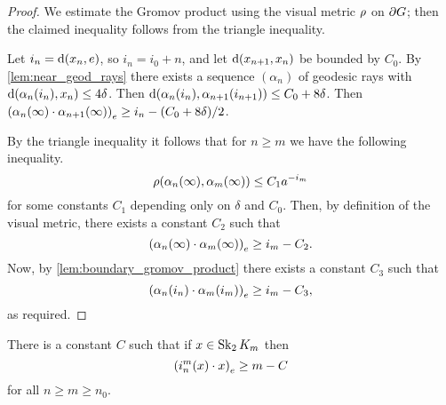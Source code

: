 \documentclass[a4paper]{article}
\begin{document}
\begin{proof}
  We estimate the Gromov product using the visual metric $\vdistance$ on 
  $\boundary G$; then the claimed inequality follows from the triangle 
  inequality. 
  
  Let $i_n = \dist(x_n, e)$, so $i_n = i_0 + n$, and let 
  $\dist(x_{n+1},x_n)$ be bounded by $C_0$. By 
  \cref{lem:near_geod_rays} there exists a sequence $(\alpha_n)$ of 
  geodesic rays with $\dist(\alpha_n(i_n), x_n) \leq 4\delta$. Then 
  $\dist(\alpha_n(i_n), \alpha_{n+1}(i_{n+1})) \leq C_0 + 8\delta$. Then 
  $\gromov{e}{\alpha_n(\infty)}{ \alpha_{n+1}(\infty)} \geq i_n - (C_0 + 
  8\delta)/2$.

  By the triangle inequality it follows that for $n\geq m$ we have the following 
  inequality.
  \begin{equation*}
    \vdistance(\alpha_n(\infty), \alpha_m(\infty)) \leq C_1 a^{-i_m}
  \end{equation*}
  for some constants $C_1$ depending only on $\delta$ and $C_0$. Then, by
  definition of the visual metric, there exists a constant $C_2$ such that
  \begin{equation*}
    \gromov{e}{\alpha_n(\infty)}{\alpha_m(\infty)} \geq i_m - C_2.
  \end{equation*}
  Now, by \cref{lem:boundary_gromov_product} there exists a constant $C_3$ such
  that
  \begin{equation*}
    \gromov{e}{\alpha_n(i_n)}{\alpha_m(i_m)} \geq i_m - C_3,
  \end{equation*}
  as required.
\end{proof}

\begin{lemma}\label{lem:linearproduct}
  There is a constant $C$ such that if $x \in \Skel_2 K_m$ then
  \begin{equation*}
    \gromov{e}{i^m_n(x)}{x} \geq m - C
  \end{equation*}
  for all $n\geq m\geq n_0$.
\end{lemma}
\end{document}
